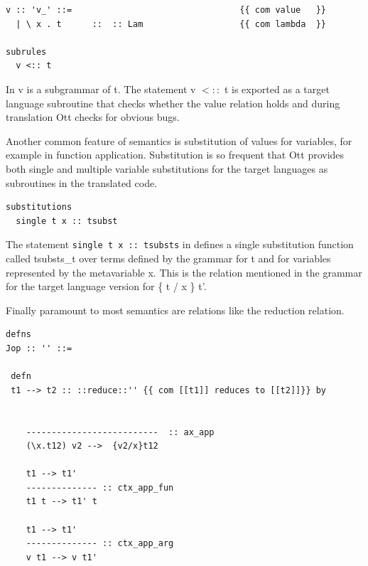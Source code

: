 \documentclass[12pt,twoside,notitlepage]{report}
\theoremstyle{plain}%
\theoremstyle{definition}
\theoremstyle{remark}
\begin{document}
\begin{lstlisting}[language={Ott}, caption={Ott value subgrammar example}, label={lst:ottvaluesubgrammarexample}]
v :: 'v_' ::=                                 {{ com value   }}
  | \ x . t      ::  :: Lam                   {{ com lambda  }}
  
subrules
  v <:: t
\end{lstlisting}

In  v is a subgrammar of t. The statement v $<::$ t is exported as a target language subroutine that checks whether the value relation holds and during translation Ott checks for obvious bugs.

Another common feature of semantics is substitution of values for variables, for example in function application. Substitution is so frequent that Ott provides both single and multiple variable substitutions for the target languages as subroutines in the translated code.


\vspace{3mm}

\begin{minipage}{\linewidth}

\begin{lstlisting}[language={Ott}, caption={Ott substitution example}, label={lst:ottsubstex}]
substitutions
  single t x :: tsubst 
\end{lstlisting}

\end{minipage}


The statement \lstinline[language={Ott}]|single t x :: tsubsts| in  defines a single substitution function called tsubsts\_t over terms defined by the grammar for t and for variables represented by the metavariable x. This is the relation mentioned in the grammar for the target language version for \{ t / x \} t'.



Finally paramount to most semantics are relations like the reduction relation.


\begin{minipage}{\linewidth}
\begin{lstlisting}[language={Ott}, caption={Ott reduction relation example}, label={lst:ottredex}]
defns
Jop :: '' ::=

 defn
 t1 --> t2 :: ::reduce::'' {{ com [[t1]] reduces to [[t2]]}} by


    --------------------------  :: ax_app
    (\x.t12) v2 -->  {v2/x}t12

    t1 --> t1'
    -------------- :: ctx_app_fun
    t1 t --> t1' t

    t1 --> t1'
    -------------- :: ctx_app_arg
    v t1 --> v t1'
\end{lstlisting}
\end{minipage}
\end{document}
